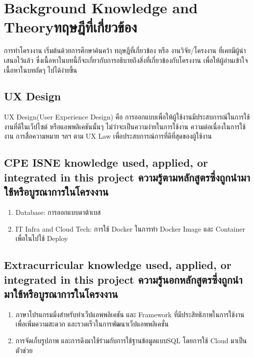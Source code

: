 \chapter{\ifenglish Background Knowledge and Theory\else ทฤษฎีที่เกี่ยวข้อง\fi}

การทำโครงงาน เริ่มต้นด้วยการศึกษาค้นคว้า ทฤษฎีที่เกี่ยวข้อง หรือ งานวิจัย/โครงงาน ที่เคยมีผู้นำเสนอไว้แล้ว ซึ่งเนื้อหาในบทนี้ก็จะเกี่ยวกับการอธิบายถึงสิ่งที่เกี่ยวข้องกับโครงงาน เพื่อให้ผู้อ่านเข้าใจเนื้อหาในบทถัดๆ ไปได้ง่ายขึ้น


\section{UX Design}
UX Design(User Experience Design) คือ การออกแบบเพื่อให้ผู้ใช้งานมีประสบการณ์ในการใช้งานที่ดีในเว็ปไซต์ หรือแอพพลิเคชันนั้นๆ
ไม่ว่าจะเป็นความง่ายในการใช้งาน ความต่อเนื่องในการใช้งาน การสื่อความหมาย ฯลฯ ตาม UX Law\cite{uxlaw} เพื่อประสบการณ์การที่ดีที่สุดของผู้ใช้งาน


\section{\ifenglish%
\ifcpe CPE \else ISNE \fi knowledge used, applied, or integrated in this project
\else%
ความรู้ตามหลักสูตรซึ่งถูกนำมาใช้หรือบูรณาการในโครงงาน
\fi
}

\begin{enumerate}
    \item Database: การออกแบบดาต้าเบส
    \item IT Infra and Cloud Tech: การใช้ Docker ในการทำ Docker Image และ Container เพื่อในไปใช้ Deploy
\end{enumerate}

\section{\ifenglish%
Extracurricular knowledge used, applied, or integrated in this project
\else%
ความรู้นอกหลักสูตรซึ่งถูกนำมาใช้หรือบูรณาการในโครงงาน
\fi
}

\begin{enumerate}
    \item ภาษาโปรแกรมมิ่งสำหรับทำเว็ปแอพพลิเคชัน และ Framework ที่มีประสิทธิภาพในการใช้งานเพื่อเพิ่มความสะดวก และรวดเร็วในการพัฒนาเว็ปแอพพลิเคชั่น
    \item การจัดเก็บรูปภาพ และการดึงมาใช้ร่วมกับการใช้ฐานข้อมูลแบบSQL โดยการใช้ Cloud มาเป็นตัวช่วย
\end{enumerate}
